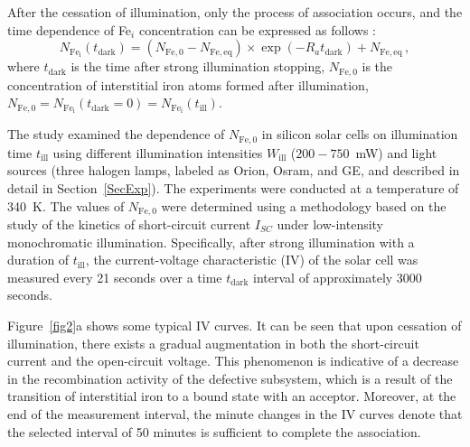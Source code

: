 \documentclass{WileyMSP-template}
\begin{document}
After the cessation of illumination, only the process of association occurs, 
and the time dependence of Fe$_i$ concentration can be expressed as follows \cite{FeB:kinetic,MurphyJAP2011}:
\begin{equation}
\label{eqNFet}
N_\mathrm{Fe_i}(t_\mathrm{dark})=(N_\mathrm{Fe,0}-N_\mathrm{Fe,eq})\times
\exp(-R_a t_\mathrm{dark})+N_\mathrm{Fe,eq}\,,
\end{equation}
where $t_\mathrm{dark}$ is the time after strong illumination stopping,
$N_\mathrm{Fe,0}$ is the concentration of interstitial iron atoms formed after illumination,
$N_\mathrm{Fe,0}=N_\mathrm{Fe_i}(t_\mathrm{dark}=0)=N_\mathrm{Fe_i}(t_\mathrm{ill})$.

The study examined the dependence of $N_\mathrm{Fe,0}$ in silicon solar cells on illumination time $t_\mathrm{ill}$
using different illumination intensities $W_\mathrm{ill}$ ($200-750$~mW) and light sources
(three halogen lamps, labeled as Orion, Osram, and GE, and described in detail in Section~\ref{SecExp}). 
The experiments were conducted at a temperature of 340~K. 
The values of $N_\mathrm{Fe,0}$ were  determined using a methodology \cite{Olikh2022:JMatSci,Olikh2021JAP}
based on the study of the kinetics of short-circuit current $I_{SC}$ under low-intensity monochromatic illumination. 
Specifically, after strong illumination with a duration of $t_\mathrm{ill}$, 
the current-voltage characteristic (IV) of the solar cell was measured every 21 seconds over a time $t_\mathrm{dark}$ interval of approximately 3000 seconds.

Figure~\ref{fig2}a shows some typical IV curves.
It can be seen that upon cessation of illumination, there exists a gradual augmentation in both the short-circuit current and the open-circuit voltage.
This phenomenon is indicative of a decrease in the recombination activity of the defective subsystem, 
which is a result of the transition of interstitial iron to a bound state with an acceptor.
Moreover, at the end of the measurement interval, the minute changes in the IV curves denote that the selected interval of 50 minutes is sufficient to complete the association. 
\end{document}
